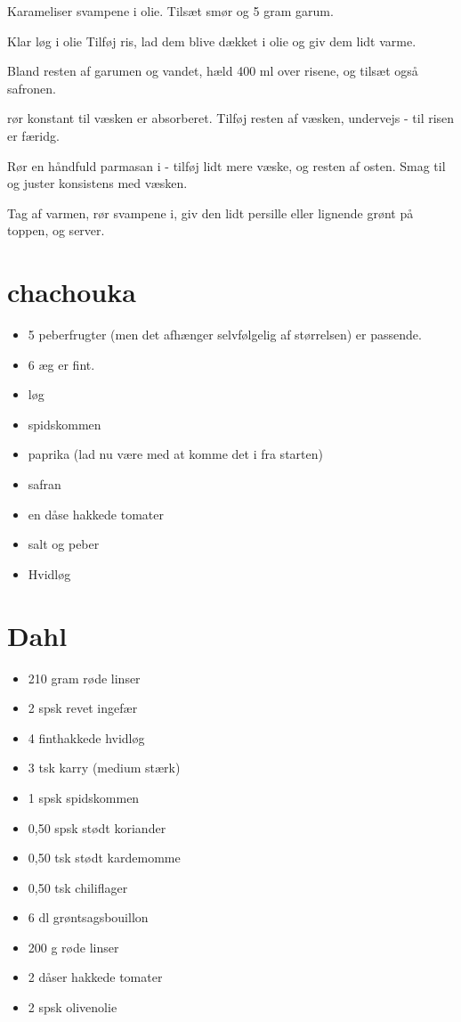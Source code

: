 \documentclass[
]{book}
\providecommand{\tightlist}{%
  \setlength{\itemsep}{0pt}\setlength{\parskip}{0pt}}
\begin{document}
Karameliser svampene i olie.
Tilsæt smør og 5 gram garum.

Klar løg i olie
Tilføj ris, lad dem blive dækket i olie og giv dem lidt varme.

Bland resten af garumen og vandet, hæld 400 ml over risene, og
tilsæt også safronen.

rør konstant til væsken er absorberet. Tilføj resten af
væsken, undervejs - til risen er færidg.

Rør en håndfuld parmasan i - tilføj lidt mere væske, og
resten af osten. Smag til og juster konsistens med væsken.

Tag af varmen, rør svampene i, giv den lidt persille eller lignende
grønt på toppen, og server.

\section{chachouka}\label{chachouka}

\begin{itemize}
\tightlist
\item
  5 peberfrugter (men det afhænger selvfølgelig af størrelsen) er passende.
\item
  6 æg er fint.
\item
  løg
\item
  spidskommen
\item
  paprika (lad nu være med at komme det i fra starten)
\item
  safran
\item
  en dåse hakkede tomater
\item
  salt og peber
\item
  Hvidløg
\end{itemize}

\section{Dahl}\label{dahl}

\begin{itemize}
\tightlist
\item
  210 gram røde linser
\item
  2 spsk revet ingefær
\item
  4 finthakkede hvidløg
\item
  3 tsk karry (medium stærk)
\item
  1 spsk spidskommen
\item
  0,50 spsk stødt koriander
\item
  0,50 tsk stødt kardemomme
\item
  0,50 tsk chiliflager
\item
  6 dl grøntsagsbouillon
\item
  200 g røde linser
\item
  2 dåser hakkede tomater
\item
  2 spsk olivenolie
\end{itemize}
\end{document}
